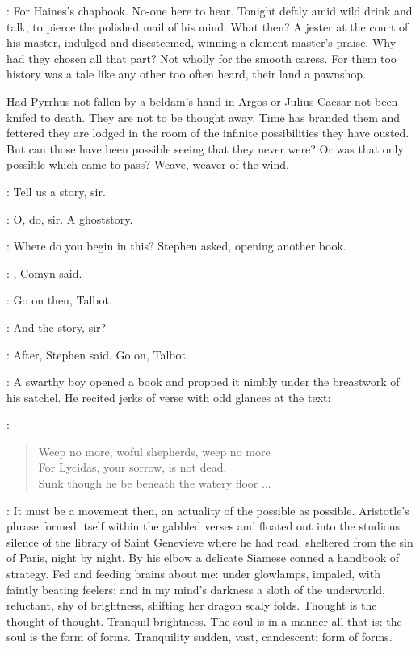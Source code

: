 \StephenInt:
For Haines's chapbook. No-one here to hear. Tonight deftly amid wild
drink and talk, to pierce the polished mail of his mind. What then? A
jester at the court of his master, indulged and disesteemed, winning a
clement master's praise. Why had they chosen all that part? Not wholly
for the smooth caress. For them too history was a tale like any other too
often heard, their land a pawnshop.

Had Pyrrhus not fallen by a beldam's hand in Argos or Julius Caesar not
been knifed to death. They are not to be thought away. Time has branded
them and fettered they are lodged in the room of the infinite
possibilities they have ousted. But can those have been possible seeing
that they never were? Or was that only possible which came to pass?
Weave, weaver of the wind.

\All:
Tell us a story, sir.

\All:
O, do, sir. A ghoststory.

\Stephen:
Where do you begin in this? Stephen asked, opening another book.

\comyn:
, Comyn said.

\Stephen:
Go on then, Talbot.

\talbot:
And the story, sir?

\Stephen:
After, Stephen said. Go on, Talbot.

:
A swarthy boy opened a book and propped it nimbly under the breastwork of
his satchel. He recited jerks of verse with odd glances at the text:

\talbot:
\begin{verse}
    Weep no more, woful shepherds, weep no more \\
    For Lycidas, your sorrow, is not dead, \\
    Sunk though he be beneath the watery floor ...
\end{verse}

:
It must be a movement then, an actuality of the possible as possible.
Aristotle's phrase formed itself within the gabbled verses and floated
out into the studious silence of the library of Saint Genevieve where he
had read, sheltered from the sin of Paris, night by night. By his elbow a
delicate Siamese conned a handbook of strategy. Fed and feeding brains
about me: under glowlamps, impaled, with faintly beating feelers: and in
my mind's darkness a sloth of the underworld, reluctant, shy of
brightness, shifting her dragon scaly folds. Thought is the thought of
thought. Tranquil brightness. The soul is in a manner all that is: the
soul is the form of forms. Tranquility sudden, vast, candescent: form of
forms.

